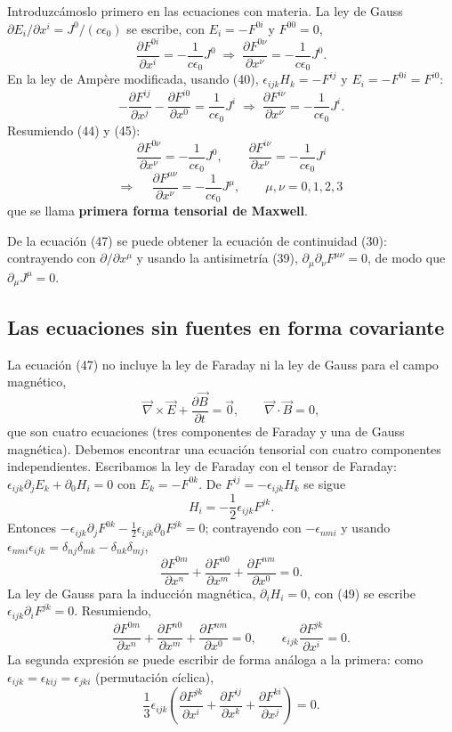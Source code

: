 Introduzcámoslo primero en las ecuaciones con materia. La ley de Gauss
$\partial E_i/\partial x^i=J^0/(c\epsilon_0)$ se escribe, con
$E_i=-F^{0i}$ y $F^{00}=0$,
\[
\frac{\partial F^{0i}}{\partial x^i} = -\frac{1}{c\epsilon_0}J^0
\;\Longrightarrow\; \frac{\partial F^{0\nu}}{\partial x^\nu} =
-\frac{1}{c\epsilon_0}J^0. \tag{43, 44}
\]
En la ley de Ampère modificada, usando (40), $\epsilon_{ijk}H_k=-F^{ij}$
y $E_i=-F^{0i}=F^{i0}$:
\[
-\frac{\partial F^{ij}}{\partial x^j}-\frac{\partial F^{i0}}{\partial x^0}
= \frac{1}{c\epsilon_0}J^i \;\Longrightarrow\; \frac{\partial F^{i\nu}}
{\partial x^\nu} = -\frac{1}{c\epsilon_0}J^i . \tag{45}
\]
Resumiendo (44) y (45):
\[
\frac{\partial F^{0\nu}}{\partial x^\nu} = -\frac{1}{c\epsilon_0}J^0,
\qquad \frac{\partial F^{i\nu}}{\partial x^\nu} = -\frac{1}{c\epsilon_0}
J^i \tag{46}
\]
\[
\Longrightarrow\quad \boxed{\ \frac{\partial F^{\mu\nu}}{\partial x^\nu}
= -\frac{1}{c\epsilon_0}J^\mu, \qquad \mu,\nu=0,1,2,3\ } \tag{47}
\]
que se llama \textbf{primera forma tensorial de Maxwell}.

De la ecuación (47) se puede obtener la ecuación de continuidad (30):
contrayendo con $\partial/\partial x^\mu$ y usando la antisimetría (39),
$\partial_\mu\partial_\nu F^{\mu\nu}=0$, de modo que
$\partial_\mu J^\mu=0$.

\subsection{Las ecuaciones sin fuentes en forma covariante}

La ecuación (47) no incluye la ley de Faraday ni la ley de Gauss para el
campo magnético,
\[
\vec\nabla\times\vec E+\frac{\partial\vec B}{\partial t}=\vec0, \qquad
\vec\nabla\cdot\vec B=0, \tag{48}
\]
que son cuatro ecuaciones (tres componentes de Faraday y una de Gauss
magnética). Debemos encontrar una ecuación tensorial con cuatro
componentes independientes. Escribamos la ley de Faraday con el tensor
de Faraday: $\epsilon_{ijk}\partial_jE_k+\partial_0H_i=0$ con
$E_k=-F^{0k}$. De $F^{ij}=-\epsilon_{ijk}H_k$ se sigue
\[
H_i = -\frac12\epsilon_{ijk}F^{jk}. \tag{49}
\]
Entonces $-\epsilon_{ijk}\partial_jF^{0k}-\frac12\epsilon_{ijk}\partial_0
F^{jk}=0$; contrayendo con $-\epsilon_{nmi}$ y usando
$\epsilon_{nmi}\epsilon_{ijk}=\delta_{nj}\delta_{mk}-\delta_{nk}
\delta_{mj}$,
\[
\frac{\partial F^{0m}}{\partial x^n}+\frac{\partial F^{n0}}{\partial
x^m}+\frac{\partial F^{nm}}{\partial x^0}=0. \tag{50}
\]
La ley de Gauss para la inducción magnética, $\partial_iH_i=0$, con (49)
se escribe $\epsilon_{ijk}\partial_iF^{jk}=0$. Resumiendo,
\[
\frac{\partial F^{0m}}{\partial x^n}+\frac{\partial F^{n0}}{\partial
x^m}+\frac{\partial F^{nm}}{\partial x^0}=0, \qquad
\epsilon_{ijk}\frac{\partial F^{jk}}{\partial x^i}=0. \tag{51}
\]
La segunda expresión se puede escribir de forma análoga a la primera: como
$\epsilon_{ijk}=\epsilon_{kij}=\epsilon_{jki}$ (permutación cíclica),
\[
\frac13\epsilon_{ijk}\left(\frac{\partial F^{jk}}{\partial x^i}+
\frac{\partial F^{ij}}{\partial x^k}+\frac{\partial F^{ki}}{\partial
x^j}\right)=0. \tag{52}
\]

